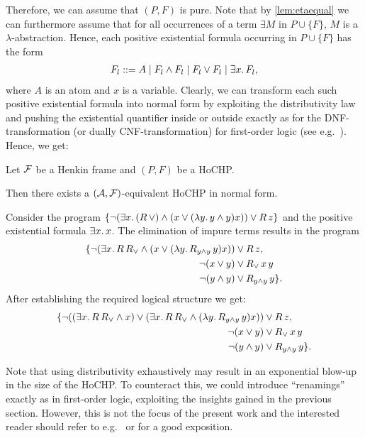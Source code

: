 \documentclass[a4paper,twoside,notitlepage,openright,11pt]{report}
\begin{document}
Therefore, we can assume that $(P,F)$ is pure. Note that by \cref{lem:etaequal} we can furthermore assume that for all occurrences of a term $\exists M$ in $P\cup\{F\}$, $M$ is a $\lambda$-abstraction. Hence, each positive existential formula occurring in $P\cup\{F\}$ has the form
\begin{align*}
  F_l::=A\mid F_l\land F_l\mid F_l\lor F_l\mid\exists x\ldotp F_l,
\end{align*}
where $A$ is an atom and $x$ is a variable. Clearly, we can transform each such positive existential formula into normal form by exploiting the distributivity law and pushing the existential quantifier inside or outside exactly as for the DNF-transformation (or dually CNF-transformation) for first-order logic (see e.g.\ \cite{NW01}). 
Hence, we get:
\begin{theorem}
  Let $\mathcal F$ be a Henkin frame and $(P,F)$ be a HoCHP.

  Then there exists a $(\mathcal A,\mathcal F)$-equivalent HoCHP in normal form. 
\end{theorem}
\begin{example}
  Consider the program $\{\neg (\exists x\ldotp (R\,\lor)\land (x\lor(\lambda y\ldotp y\land y)x))\lor R\,z\}$ and the positive existential formula $\exists x\ldotp x$. The elimination of impure terms results in the program
  \begin{align*}
    \{\neg (\exists x\ldotp R\,R_\lor\land (x\lor(\lambda y\ldotp R_{y\land y}\,y)x))&\lor R\,z,\\
    \neg (x\lor y)&\lor R_\lor\,x\,y\\
    \neg (y\land y)&\lor R_{y\land y}\,y\}.
  \end{align*}
  After establishing the required logical structure we get:
    \begin{align*}
      \{\neg ((\exists x\ldotp R\,R_\lor\land x)\lor(\exists x\ldotp R\,R_\lor\land(\lambda y\ldotp R_{y\land y}\,y)x))&\lor R\,z,\\
      \neg (x\lor y)&\lor R_\lor\,x\,y\\
      \neg (y\land y)&\lor R_{y\land y}\,y\}.
  \end{align*}
\end{example}
Note that using distributivity exhaustively may result in an exponential blow-up in the size of the HoCHP. To counteract this, we could introduce ``renamings'' exactly as in first-order logic, exploiting the insights gained in the previous section. However, this is not the focus of the present work and the interested reader should refer to e.g.\ \cite{PG86} or \cite{NW01} for a good exposition.
\end{document}
